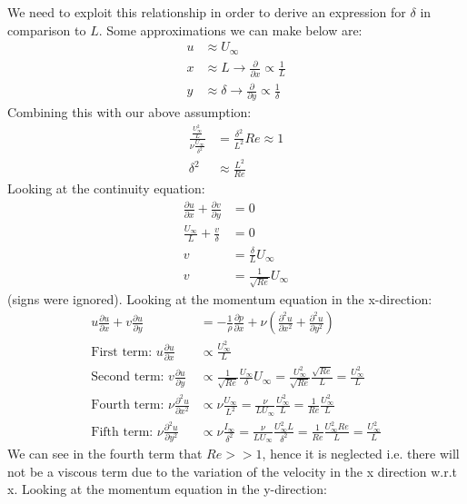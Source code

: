 \documentclass[class=report, crop=false, 12pt,a4paper]{standalone}
\begin{document}
We need to exploit this relationship in order to derive an expression for $\delta$ in comparison to $L$. Some approximations we can make below are:
\begin{align}
  u &\approx U_\infty\\
  x &\approx L \rightarrow \frac{\partial}{\partial x} \propto \frac{1}{L}\\
  y &\approx \delta \rightarrow \frac{\partial}{\partial y} \propto \frac{1}{\delta}
\end{align}
Combining this with our above assumption:
\begin{align}
  \frac{\frac{U_\infty^2}{L}}{\nu \frac{U_\infty}{\delta^2}} &= \frac{\delta^2}{L^2} Re \approx 1\\
  \delta^2 &\approx \frac{L^2}{Re}
\end{align}
Looking at the continuity equation:
\begin{align}
  \frac{\partial u}{\partial x} + \frac{\partial v}{\partial y} &= 0\\
  \frac{U_\infty}{L} + \frac{v}{\delta} &= 0\\
  v &= \frac{\delta}{L}U_\infty\\
  v &= \frac{1}{\sqrt{Re}} U_\infty
\end{align}
(signs were ignored). Looking at the momentum equation in the x-direction:
\begin{align}
  u\frac{\partial u}{\partial x} + v \frac{\partial u }{\partial y} &= - \frac{1}{\rho} \frac{\partial p}{\partial x} + \nu \left(\frac{\partial^2 u}{\partial x^2} + \frac{\partial^2 u}{\partial y^2}\right)\\
  \textrm{First term: } u\frac{\partial u}{\partial x} &\propto \frac{U_\infty^2}{L}\\
  \textrm{Second term: } v\frac{\partial u}{\partial y} &\propto \frac{1}{\sqrt{Re}} \frac{U_\infty}{\delta} U_\infty = \frac{U_\infty^2}{\sqrt{Re}} \frac{\sqrt{Re}}{L} = \frac{U_\infty^2}{L}\\
  \textrm{Fourth term: } \nu \frac{\partial^2 u}{\partial x^2} &\propto \nu \frac{U_\infty}{L^2} = \frac{\nu}{L U_\infty} \frac{U_\infty^2}{L} = \frac{1}{Re} \frac{U_\infty^2}{L}\\
  \textrm{Fifth term: } \nu \frac{\partial^2 u}{\partial y^2} &\propto \nu \frac{I_\infty}{\delta^2} = \frac{\nu}{L U_\infty} \frac{U_\infty^2 L}{\delta^2} = \frac{1}{Re} \frac{U_\infty^2 Re}{L} = \frac{U_\infty^2}{L}
\end{align}
We can see in the fourth term that $Re >> 1$, hence it is neglected i.e. there will not be a viscous term due to the variation of the velocity in the x direction w.r.t x. Looking at the momentum equation in the y-direction:
\end{document}
